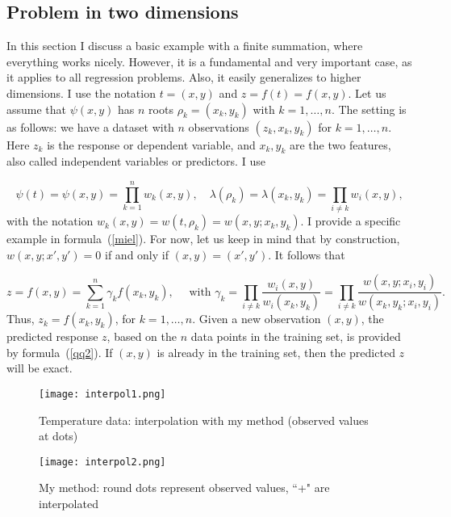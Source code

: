 \documentclass[oneside,10pt]{book}
\begin{document}
\subsection{Problem in two dimensions} \label{totor}

In this section I discuss a basic example with a finite summation, where everything works nicely. However, it is a fundamental and very important case, as it applies to all regression problems. Also, it easily generalizes to higher dimensions. I use the notation 
 $t=(x,y)$ and $z=f(t)=f(x, y)$. Let us assume that $\psi(x,y)$ has $n$ roots $\rho_k=(x_k,y_k)$ with $k=1,\dots,n$. The setting is as follows: we have a dataset with $n$ observations $(z_k,x_k,y_k)$ for $k=1,\dots,n$. Here $z_k$ is the response or
 dependent variable, and $x_k, y_k$ are the two features, also called independent variables or predictors. I use

$$
\psi(t) = \psi(x,y) = \prod_{k=1}^n w_k(x,y), \quad \lambda(\rho_k)=\lambda(x_k,y_k) = \prod_{i\neq k} w_i(x,y),  
$$
with the notation $w_k(x,y) = w(t,\rho_k) = w(x, y; x_k, y_k)$. I provide a specific example in formula~(\ref{miel}). For now, let us keep in mind that by construction, $w(x, y; x', y')=0$ if and only if $(x,y)=(x',y')$. It follows that

\begin{equation}
z = f(x,y) =  \sum_{k=1}^n   \gamma_k f(x_k,y_k), \quad \text{ with } \gamma_k = 
\prod_{i\neq k} \frac{w_i(x,y)}{w_i(x_k,y_k)}
=\prod_{i\neq k} \frac{w(x,y; x_i,y_i)}{w(x_k,y_k; x_i,y_i)}
. \label{qq2}
\end{equation}
Thus, $z_k = f(x_k,y_k)$, for $k=1,\dots,n$. Given a new observation $(x, y)$, the predicted response $z$, based on the $n$ data points in the training set, is provided
 by formula~(\ref{qq2}). If $(x,y)$ is already in the training set, then the predicted $z$ will be exact. 


\begin{figure}%
\centering
\texttt{[image: interpol1.png]} %
\caption{Temperature data: interpolation with my method (observed values at dots)}
\label{fig:interpol1}
\end{figure}

\begin{figure}%
\centering
\texttt{[image: interpol2.png]} %
\caption{My method: round dots represent observed values, ``+" are interpolated}
\label{fig:interpol2}
\end{figure}
\end{document}
